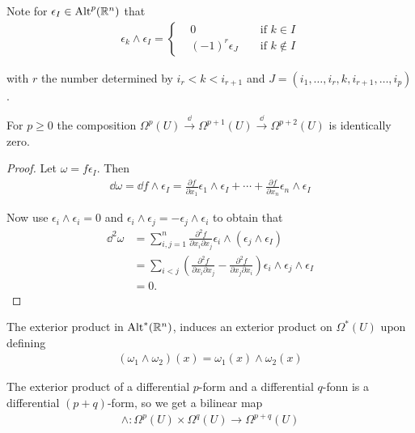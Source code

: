 Note for $\epsilon_I\in \operatorname{Alt}^p({\mathbb{R}}^n)$ that
\begin{align*}
  \epsilon_k\wedge\epsilon_I 
  = \left\{\begin{aligned}
    &0 && \text{ if } k\in I \\
    &(-1)^{r}\epsilon_{J} && \text{ if } k\not\in I
  \end{aligned}\right.
\end{align*}

with $r$ the number determined by $i_r < k < i_{r+1}$ and $J=(i_1, \ldots, i_r, k, i_{r+1},\ldots, i_p)$.


\begin{lemma}\label{lemma:3-5}
  For $p\ge 0$ the composition $\Omega^p(U)\xrightarrow{\dd}\Omega^{p+1}(U)\xrightarrow{\dd}\Omega^{p+2}(U)$ is 
  identically zero.
\end{lemma}

\begin{proof}
  Let $\omega = f\epsilon_I$. Then 
  \begin{align*}
    \dd\omega 
    = \dd f\wedge\epsilon_I
    = \frac{\partial f }{\partial x_1}\epsilon_1\wedge\epsilon_I + \cdots + \frac{\partial f}{\partial x_n}\epsilon_n\wedge\epsilon_I
  \end{align*}

  Now use $\epsilon_i\wedge\epsilon_i=0$ and $\epsilon_i\wedge\epsilon_j=-\epsilon_j\wedge\epsilon_i$ to obtain that 
  \begin{align*}
      \dd^{2}\omega 
      & = \sum_{i,j=1}^{n}\frac{\partial^{2}f}{\partial x_{i}\partial x_{j}}
        \epsilon_{i}\wedge(\epsilon_{j}\wedge\epsilon_{I}) \\
      & = \sum_{i<j}\left(\frac{\partial^{2}f}{\partial x_{i}\partial x_{j}}-\frac{\partial^{2}f}{\partial x_{j}\partial x_{i}}\right)
        \epsilon_{i}\wedge\epsilon_{j}\wedge\epsilon_{I}\\
      & = 0.
  \end{align*}
\end{proof}

The exterior product in $\operatorname{Alt}^{*}({\mathbb{R}}^n)$, induces an exterior product on $\Omega^*(U)$ upon 
defining
\begin{align*}
  (\omega_1\wedge\omega_2)(x) = \omega_1(x)\wedge\omega_2(x)
\end{align*}

The exterior product of a differential $p$-form and a differential $q$-fonn is a
differential $(p + q)$-form, so we get a bilinear map
\begin{align*}
  \wedge: \Omega^p(U)\times\Omega^q(U)\to\Omega^{p+q}(U)
\end{align*}


